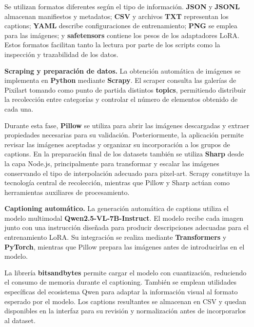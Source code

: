 \documentclass[a4paper,11pt,titlepage]{scrbook}
\begin{document}
Se utilizan formatos diferentes según el tipo de información. \textbf{JSON} y \textbf{JSONL} almacenan manifiestos y metadatos; \textbf{CSV} y archivos \textbf{TXT} representan los captions; \textbf{YAML} describe configuraciones de entrenamiento; \textbf{PNG} se emplea para las imágenes; y \textbf{safetensors} contiene los pesos de los adaptadores LoRA. Estos formatos facilitan tanto la lectura por parte de los scripts como la inspección y trazabilidad de los datos.

\medskip

\textbf{Scraping y preparación de datos.}
La obtención automática de imágenes se implementa en \textbf{Python} mediante \textbf{Scrapy}. El scraper consulta las galerías de Pixilart tomando como punto de partida distintos \textbf{topics}, permitiendo distribuir la recolección entre categorías y controlar el número de elementos obtenido de cada una.

Durante esta fase, \textbf{Pillow} se utiliza para abrir las imágenes descargadas y extraer propiedades necesarias para su validación. Posteriormente, la aplicación permite revisar las imágenes aceptadas y organizar su incorporación a los grupos de captions. En la preparación final de los datasets también se utiliza \textbf{Sharp} desde la capa Node.js, principalmente para transformar y escalar las imágenes conservando el tipo de interpolación adecuado para pixel-art. Scrapy constituye la tecnología central de recolección, mientras que Pillow y Sharp actúan como herramientas auxiliares de procesamiento.

\medskip

\textbf{Captioning automático.}
La generación automática de captions utiliza el modelo multimodal \textbf{Qwen2.5-VL-7B-Instruct}. El modelo recibe cada imagen junto con una instrucción diseñada para producir descripciones adecuadas para el entrenamiento LoRA. Su integración se realiza mediante \textbf{Transformers} y \textbf{PyTorch}, mientras que Pillow prepara las imágenes antes de introducirlas en el modelo.

La librería \textbf{bitsandbytes} permite cargar el modelo con cuantización, reduciendo el consumo de memoria durante el captioning. También se emplean utilidades específicas del ecosistema Qwen para adaptar la información visual al formato esperado por el modelo. Los captions resultantes se almacenan en CSV y quedan disponibles en la interfaz para su revisión y normalización antes de incorporarlos al dataset.

\medskip
\end{document}

